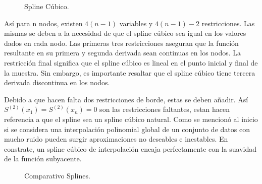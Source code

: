 \begin{figure}[h]
\caption{Spline C\'ubico.}
\label{spline_3}
\end{figure}


\hspace{0.4cm}As\'i para n nodos, existen $4(n-1)$ variables y $4(n-1)-2$ restricciones. Las mismas se deben a la necesidad de que el spline c\'ubico sea igual en los valores dados en cada nodo. Las primeras tres restricciones aseguran que la funci\'on resultante en su primera y segunda derivada sean continuas en los nodos. La restricci\'on final significa que el spline c\'ubico es lineal en el punto inicial y final de la muestra. Sin embargo, es importante resaltar que el spline c\'ubico tiene tercera derivada discontinua en los nodos.

\hspace{0.4cm}Debido a que hacen falta dos restricciones de borde, estas se deben a\~nadir. As\'i  $S^{(2)}(x_{1}) = S^{(2)}(x_{n}) = 0$ son las restricciones faltantes, estan hacen referencia a que el spline sea un spline c\'ubico natural. Como se mencion\'o al inicio si se considera una interpolaci\'on polinomial global de un conjunto de datos con mucho ruido pueden surgir aproximaciones no deseables e inestables. En constrate, un spline c\'ubico de interpolaci\'on encaja perfectamente con la suavidad de la funci\'on subyacente.

\begin{figure}[h]
\caption{Comparativo Splines.}
\end{figure}


